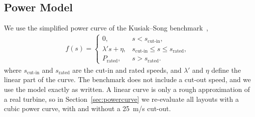 \documentclass[journal,twoside]{IEEEtran}
\begin{document}
\subsection{Power Model}
\label{sec:powermodel}

We use the simplified power curve of the Kusiak--Song benchmark~\cite{Kusiak2010},
\begin{align}\label{eq7}
f(s) =
\begin{cases}
0, & s < s_{\text{cut-in}},\\
\lambda' s + \eta, & s_{\text{cut-in}} \leq s \leq s_{\text{rated}},\\
P_{\text{rated}}, & s > s_{\text{rated}}.
\end{cases}
\end{align}
where $s_{\text{cut-in}}$ and $s_{\text{rated}}$ are the cut-in and rated speeds, and $\lambda'$ and $\eta$ define the linear part of the curve. The benchmark does not include a cut-out speed, and we use the model exactly as written. A linear curve is only a rough approximation of a real turbine, so in Section~\ref{sec:powercurve} we re-evaluate all layouts with a cubic power curve, with and without a 25~m/s cut-out.
\end{document}
